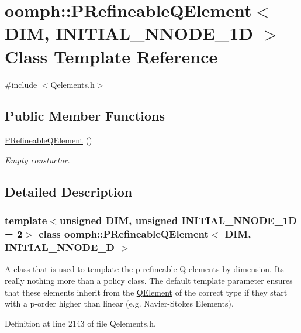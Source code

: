 \hypertarget{classoomph_1_1PRefineableQElement}{}\section{oomph\+:\+:P\+Refineable\+Q\+Element$<$ D\+IM, I\+N\+I\+T\+I\+A\+L\+\_\+\+N\+N\+O\+D\+E\+\_\+1D $>$ Class Template Reference}
\label{classoomph_1_1PRefineableQElement}


{\ttfamily \#include $<$Qelements.\+h$>$}

\subsection*{Public Member Functions}
\begin{DoxyCompactItemize}
\item 
\hyperlink{classoomph_1_1PRefineableQElement_a795206217640d5e909b5162c13f94af9}{P\+Refineable\+Q\+Element} ()
\begin{DoxyCompactList}\small\item\em Empty constuctor. \end{DoxyCompactList}\end{DoxyCompactItemize}


\subsection{Detailed Description}
\subsubsection*{template$<$unsigned D\+IM, unsigned I\+N\+I\+T\+I\+A\+L\+\_\+\+N\+N\+O\+D\+E\+\_\+1D = 2$>$\newline
class oomph\+::\+P\+Refineable\+Q\+Element$<$ D\+I\+M, I\+N\+I\+T\+I\+A\+L\+\_\+\+N\+N\+O\+D\+E\+\_\+D $>$}

A class that is used to template the p-\/refineable Q elements by dimension. It\textquotesingle{}s really nothing more than a policy class. The default template parameter ensures that these elements inherit from the \hyperlink{classoomph_1_1QElement}{Q\+Element} of the correct type if they start with a p-\/order higher than linear (e.\+g. Navier-\/\+Stokes Elements). 

Definition at line 2143 of file Qelements.\+h.



